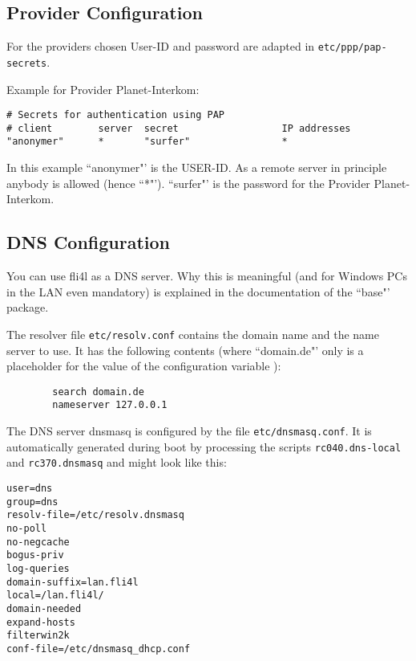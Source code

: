 \subsection{Provider Configuration}

For the providers chosen User-ID and password are adapted in \texttt{etc/ppp/pap-secrets}.

Example for Provider Planet-Interkom:

\begin{example}
\begin{verbatim}
# Secrets for authentication using PAP
# client        server  secret                  IP addresses
"anonymer"      *       "surfer"                *
\end{verbatim}
\end{example}

In this example ``anonymer"' is the USER-ID. As a remote server in principle anybody is
allowed (hence ``*"'). ``surfer"' is the password for the Provider Planet-Interkom.


\subsection{DNS Configuration}


You can use fli4l as a DNS server. Why this is meaningful (and for Windows PCs
in the LAN even mandatory) is explained in the documentation of the ``base"' package.

The resolver file \texttt{etc/resolv.conf} contains the domain name and the
name server to use. It has the following contents (where ``domain.de"' only
is a placeholder for the value of the configuration variable
):

\begin{example}
\begin{verbatim}
        search domain.de
        nameserver 127.0.0.1
\end{verbatim}
\end{example}

The DNS server dnsmasq is configured by the file \texttt{etc/dnsmasq.conf}.
It is automatically generated during boot by processing the scripts \texttt{rc040.dns-local}
and \texttt{rc370.dnsmasq} and might look like this:

\begin{example}
\begin{verbatim}
user=dns
group=dns
resolv-file=/etc/resolv.dnsmasq
no-poll
no-negcache
bogus-priv
log-queries
domain-suffix=lan.fli4l
local=/lan.fli4l/
domain-needed
expand-hosts
filterwin2k
conf-file=/etc/dnsmasq_dhcp.conf
\end{verbatim}
\end{example}





